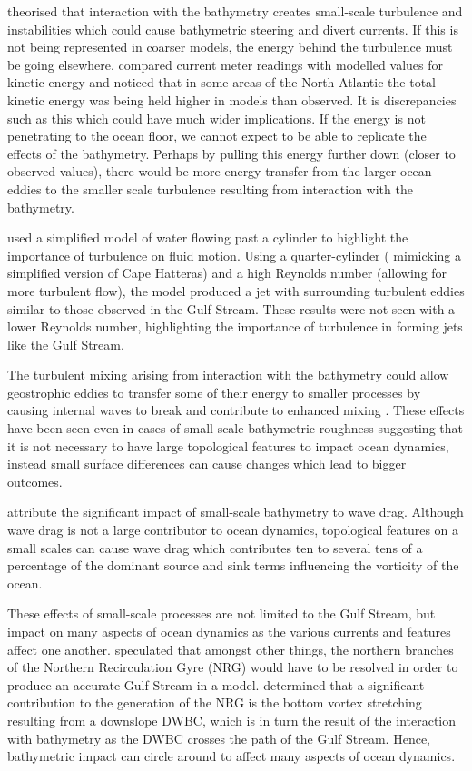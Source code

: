 \documentclass[..\EOYR.tex]{subfiles}
\begin{document}
\citep{NaveiraGarabato2013} theorised that interaction with the bathymetry creates small-scale turbulence and instabilities which could cause bathymetric steering and divert currents. If this is not being represented in coarser models, the energy behind the turbulence must be going elsewhere. \citep{Scott2010} compared current meter readings with modelled values for kinetic energy and noticed that in some areas of the North Atlantic the total kinetic energy was being held higher in models than observed. It is discrepancies such as this which could have much wider implications. If the energy is not penetrating to the ocean floor, we cannot expect to be able to replicate the effects of the bathymetry. Perhaps by pulling this energy further down (closer to observed values), there would be more energy transfer from the larger ocean eddies to the smaller scale turbulence resulting from interaction with the bathymetry.

\citep{Tansley2001} used a simplified model of water flowing past a cylinder to highlight the importance of turbulence on fluid motion. Using a quarter-cylinder ( mimicking a simplified version of Cape Hatteras) and a high Reynolds number (allowing for more turbulent flow), the model produced a jet with surrounding turbulent eddies similar to those observed in the Gulf Stream. These results were not seen with a lower Reynolds number, highlighting the importance of turbulence in forming jets like the Gulf Stream.

The turbulent mixing arising from interaction with the bathymetry could allow geostrophic eddies to transfer some of their energy to smaller processes by causing internal waves to break and contribute to enhanced mixing \citep{Nikurashin2012a}. These effects have been seen even in cases of small-scale bathymetric roughness suggesting that it is not necessary to have large topological features to impact ocean dynamics, instead small surface differences can cause changes which lead to bigger outcomes.

\citep{NaveiraGarabato2013} attribute the significant impact of small-scale bathymetry to wave drag. Although wave drag is not a large contributor to ocean dynamics, topological features on a small scales can cause wave drag which contributes ten to several tens of a percentage of the dominant source and sink terms influencing the vorticity of the ocean.


These effects of small-scale processes are not limited to the Gulf Stream, but impact on many aspects of ocean dynamics as the various currents and features affect one another. 
\citep{Ezer2016} speculated that amongst other things, the northern branches of the Northern Recirculation Gyre (NRG) would have to be resolved in order to produce an accurate Gulf Stream in a model. \citep{Zhang2007} determined that a significant contribution to the generation of the NRG is the bottom vortex stretching resulting from a downslope DWBC, which is in turn the result of the interaction with bathymetry as the DWBC crosses the path of the Gulf Stream. Hence, bathymetric impact can circle around to affect many aspects of ocean dynamics.
\end{document}

